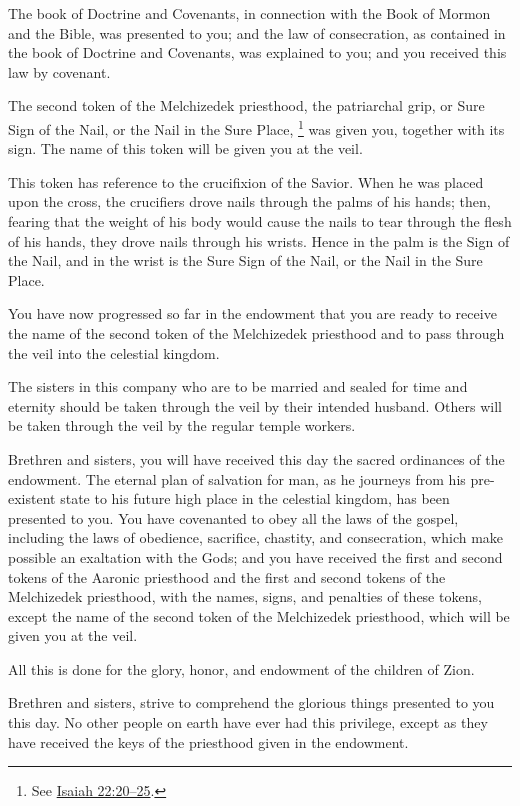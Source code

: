 				The book of Doctrine and Covenants, in connection with the Book of Mormon and the Bible, was presented to you; and the law of consecration, as contained in the book of Doctrine and Covenants, was explained to you; and you received this law by covenant.

				The second token of the Melchizedek priesthood, the patriarchal grip, or Sure Sign of the Nail, or the Nail in the Sure Place,%
					\footnote{%
						See \hyperref[ISAIAH-22-20]{Isaiah 22:20--25}.
						}
				was given you, together with its sign. The name of this token will be given you at the veil.

				This token has reference to the crucifixion of the Savior. When he was placed upon the cross, the crucifiers drove nails through the palms of his hands; then, fearing that the weight of his body would cause the nails to tear through the flesh of his hands, they drove nails through his wrists. Hence in the palm is the Sign of the Nail, and in the wrist is the Sure Sign of the Nail, or the Nail in the Sure Place.

				You have now progressed so far in the endowment that you are ready to receive the name of the second token of the Melchizedek priesthood and to pass through the veil into the celestial kingdom.

				The sisters in this company who are to be married and sealed for time and eternity should be taken through the veil by their intended husband. Others will be taken through the veil by the regular temple workers.

				Brethren and sisters, you will have received this day the sacred ordinances of the endowment. The eternal plan of salvation for man, as he journeys from his pre-existent state to his future high place in the celestial kingdom, has been presented to you. You have covenanted to obey all the laws of the gospel, including the laws of obedience, sacrifice, chastity, and consecration, which make possible an exaltation with the Gods; and you have received the first and second tokens of the Aaronic priesthood and the first and second tokens of the Melchizedek priesthood, with the names, signs, and penalties of these tokens, except the name of the second token of the Melchizedek priesthood, which will be given you at the veil.

				All this is done for the glory, honor, and endowment of the children of Zion.

				Brethren and sisters, strive to comprehend the glorious things presented to you this day. No other people on earth have ever had this privilege, except as they have received the keys of the priesthood given in the endowment.

